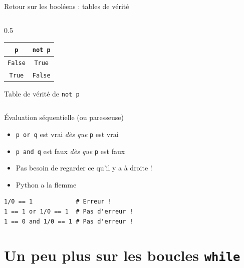 \documentclass{beamer}
\begin{document}
\begin{frame}{Retour sur les booléens : tables de vérité}
\begin{columns}
\begin{column}{0.5\textwidth}
    \begin{tabular}{|c||c|}
      \hline
       \texttt{p} & \texttt{not p} \\
      \hline
      \hline
      \texttt{False}  & \texttt{True} \\
      \hline
      \texttt{True}   & \texttt{False}  \\
      \hline
    \end{tabular}%

    \medskip

    Table de vérité de \texttt{not p}
    \end{column}
    \end{columns}

  \end{frame}

  \begin{frame}[fragile]{Évaluation séquentielle (ou paresseuse)}

    \begin{itemize}
    \item \texttt{p or q} est vrai \emph{dès que} \texttt{p} est vrai
    \item \texttt{p and q} est faux \emph{dès que} \texttt{p} est faux
    \item[\MVRightArrow{}] Pas besoin de regarder ce qu'il y a à droite ! \pause
    \item[\MVRightArrow{}] Python a la flemme
    \end{itemize}

\begin{verbatim}
1/0 == 1            # Erreur !
1 == 1 or 1/0 == 1  # Pas d'erreur !
1 == 0 and 1/0 == 1 # Pas d'erreur !
\end{verbatim}

  \end{frame}

  \section{Un peu plus sur les boucles \texttt{while}}
\end{document}
